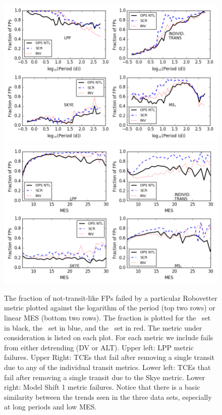 \begin{figure}[htbp]
    \centering
    \includegraphics[width=0.9\linewidth]{fig-fractionFailsByMetric.png}
    \includegraphics[width=0.9\linewidth]{fig-fractionFailsByMetricMes.png}
    \caption{The fraction of not-transit-like FPs failed by a particular Robovetter metric plotted against the logarithm of the period (top two rows) or linear MES (bottom two rows).  The fraction is plotted for the \opstce\ set in black, the \scrtce\ set in blue, and the \invtce\ set in red. The metric under consideration is listed on each plot.  For each metric we include fails from either detrending (DV or ALT). Upper left: LPP metric failures. Upper Right: TCEs that fail after removing a single transit due to any of the individual transit metrics.  Lower left: TCEs that fail after removing a single transit due to the Skye metric. Lower right: Model Shift 1 metric failures. Notice that there is a basic similarity between the trends seen in the three data sets, especially at long periods and low MES.}
    \label{f:fractionFailMetric}
\end{figure}

